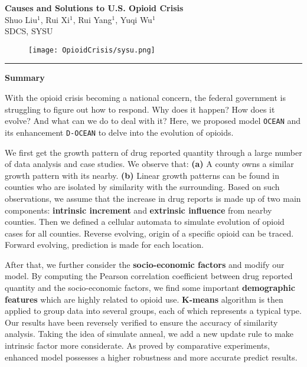 \documentclass[a4paper]{article}
\newcommand{\HRule}{\rule{\linewidth}{0.5mm}}
\begin{document}
\newtheorem{assumption}{Assumption}
\begin{center}
\LARGE{\textbf{Causes and Solutions to U.S. Opioid Crisis\\}}
\vspace{6mm}
\normalsize{Shuo Liu$^1$, Rui Xi$^1$, Rui Yang$^1$, Yuqi Wu$^1$}\\
\vspace{2mm}
\small{SDCS, SYSU}\\
\end{center}

\begin{figure}[h]
	\centering  
	\texttt{[image: OpioidCrisis/sysu.png]} 
\end{figure}

\noindent \HRule
\renewcommand{\baselinestretch}{1.8}
\begin{center}
    \textbf{\large{Summary}}
\end{center}
With the opioid crisis becoming a national concern, the federal government is struggling to figure out how to respond. Why does it happen? How does it evolve? And what can we do to deal with it? Here, we proposed model \texttt{OCEAN} and its enhancement \texttt{D-OCEAN} to delve into the evolution of opioids.

We first get the growth pattern of drug reported quantity through a large number of data analysis and case studies. We observe that: \textbf{(a)} A county owns a similar growth pattern with its nearby.  \textbf{(b)} Linear growth patterns can be found in counties who are isolated by similarity with the surrounding. Based on such observations, we assume that the increase in drug reports is made up of two main components: \textbf{intrinsic increment} and \textbf{extrinsic influence} from nearby counties. Then we defined a cellular automata to simulate evolution of opioid cases for all counties. Reverse evolving, origin of a specific opioid can be traced. Forward evolving, prediction is made for each location.

After that, we further consider the \textbf{socio-economic factors} and modify our model. By computing the Pearson correlation coefficient between drug reported quantity and the socio-economic factors, we find some important \textbf{demographic features} which are highly related to opioid use. \textbf{K-means} algorithm is then applied to group data into several groups, each of which represents a typical type. Our results have been reversely verified to ensure the accuracy of similarity analysis. Taking the idea of simulate anneal, we add a new update rule to make intrinsic factor more considerate. As proved by comparative experiments, enhanced model possesses a higher robustness and more accurate predict results.
\end{document}
